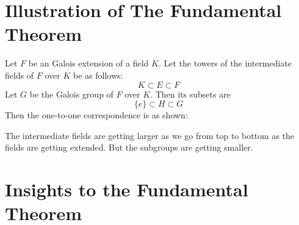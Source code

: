 \section{Illustration of The Fundamental Theorem}
\begin{minipage}{0.68\textwidth}
  Let \(F\) be an Galois extension of a field \(K\). Let the towers of the intermediate fields of \(F\) over \(K\) be as follows:
  \[
    K \subset E \subset F
  \]
\noindent
  Let \(G\) be the Galois group of \(F\) over \(K\). Then its subsets are
  \[
    \{e\} \subset H \subset G
  \]
  Then the one-to-one correspondence is as shown:
\end{minipage}\hspace{2mm}
\begin{minipage}{0.3\textwidth}

  \begin{tcolorbox}[colback=gray!20, colframe=blue!20, title={\footnotesize \textcolor{black}{Galois-correspondence}}, width=5cm]
  \end{tcolorbox}
\end{minipage}

\vspace{5mm}
\begin{remark}
  The intermediate fields are getting larger as we go from top to bottom  as the fields are getting extended. But the subgroups are getting smaller.
\end{remark}

\section{Insights to the Fundamental Theorem}


